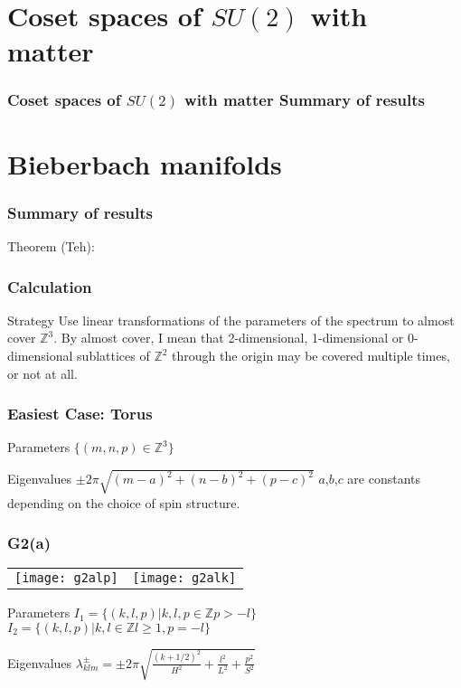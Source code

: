 \documentclass{beamer}
\def\Z{{\mathbb Z}}
\begin{document}
\section{Coset spaces of $SU(2)$ with matter}
\begin{frame}
	\frametitle{Coset spaces of $SU(2)$ with matter Summary of results}
\end{frame}

\section{Bieberbach manifolds}
\begin{frame}
	\frametitle{Summary of results}
	Theorem (Teh):
\end{frame}

\begin{frame}
	\frametitle{Calculation}

	\begin{block}{Strategy}
	Use linear transformations of the parameters of the spectrum to almost cover $\Z ^3$.  By almost cover, I mean that 2-dimensional, 1-dimensional or 0-dimensional sublattices of $\Z^2$ through the origin may be covered multiple times, or not at all.
	\end{block}
\end{frame}

\begin{frame}
	\frametitle{Easiest Case: Torus}
	\begin{block}{Parameters}
		$\{(m,n,p) \in \Z ^3 \}$
	\end{block}
	\begin{block}{Eigenvalues}
		$\pm 2 \pi \sqrt{(m-a)^2 + (n-b)^2 + (p-c)^2}$
		$a$,$b$,$c$ are constants depending on the choice of spin structure.
	\end{block}
\end{frame}

\begin{frame}
	\frametitle{G2(a)}
		\begin{tabular}[]{lr}
\texttt{[image: g2alp]} & \texttt{[image: g2alk]}\\
		\end{tabular}

		\begin{block}{Parameters}
			$I_1 = \{(k,l,p)| k,l,p \in \Z p > -l \}$
			$I_2 = \{(k,l,p)| k,l \in \Z l \geq 1, p = -l \}$
		\end{block}
		\begin{block}{Eigenvalues}
			$\lambda_{klm}^{\pm} = \pm 2 \pi \sqrt{\frac{(k + 1/2)^2}{H^2} + \frac{l^2}{L^2} + \frac{p^2}{S^2}}$
		\end{block}
\end{frame}
\end{document}
